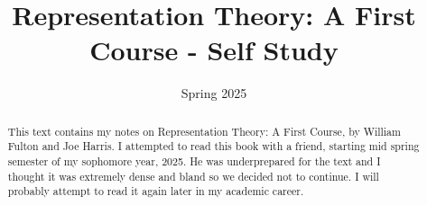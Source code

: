 \documentclass[11pt, letterpaper]{report}
\title{Representation Theory: A First Course - Self Study}
\date{Spring 2025}
\begin{document}
\maketitle
\begin{abstract}
	This text contains my notes on Representation Theory: A First Course, by William Fulton and Joe Harris. I attempted to read this book with a friend, starting mid spring semester of my sophomore year, 2025. He was underprepared for the text and I thought it was extremely dense and bland so we decided not to continue. I will probably attempt to read it again later in my academic career.
\end{abstract}
\tableofcontents

\end{document}
